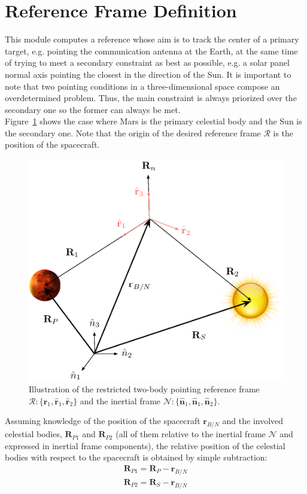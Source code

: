 \documentclass[]{AVSSimReportMemo}
\begin{document}
\section{Reference Frame Definition}
This module computes a reference whose aim is to track the center of a primary target, e.g. pointing the communication antenna at the Earth, at the same time of trying to meet a secondary constraint as best as possible, e.g. a solar panel normal axis pointing the closest in the direction of the Sun.  It is important to note that two pointing conditions in a three-dimensional space compose an overdetermined problem. Thus, the main constraint is always priorized over the secondary one so the former can always be met.\\
Figure~\ref{fig:fig1} shows the case where Mars is the primary celestial body and the Sun is the secondary one. Note that the origin of the desired reference frame $\mathcal{R}$ is the position of the spacecraft.
\begin{figure}[htb]
	\centerline{
	\includegraphics[]{Figures/fig1}
	}
	\caption{Illustration of the restricted two-body pointing reference frame $\mathcal{R}:\{ \hat{\bm r}_{1},\hat{\bm r}_{1}, \hat{\bm r}_{2} \}$ and the inertial frame $\mathcal{N}:\{ \hat{\bm n}_{1},\hat{\bm n}_{1}, \hat{\bm n}_{2} \}$.}
	\label{fig:fig1}
\end{figure}

Assuming knowledge of the position of the spacecraft $\bm{r}_{B/N}$ and the involved celestial bodies, $\bm{R}_{P1}$ and  $\bm{R}_{P2}$ (all of them relative to the inertial frame $\mathcal{N}$ and expressed in inertial frame components), the relative position of the celestial bodies with respect to the spacecraft is obtained by simple subtraction:
\begin{subequations}
	\begin{align}
		 \bm{R}_{P1} =\bm{R}_{P} - \bm{r}_{B/N} \\
		 \bm{R}_{P2} =\bm{R}_{S} - \bm{r}_{B/N} 
	\end{align}
\end{subequations}
\end{document}
